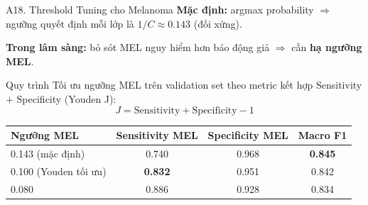 \documentclass[10pt, aspectratio=169]{beamer}
\begin{document}
\begin{frame}{A18. Threshold Tuning cho Melanoma}
    \footnotesize
    \textbf{Mặc định:} argmax probability $\Rightarrow$ ngưỡng quyết định mỗi lớp là $1/C \approx 0.143$ (đối xứng).

    \textbf{Trong lâm sàng:} bỏ sót MEL nguy hiểm hơn báo động giả $\Rightarrow$ cần \textbf{hạ ngưỡng MEL}.

    \vspace{0.2cm}
    \begin{block}{Quy trình}
        \footnotesize Tối ưu ngưỡng MEL trên validation set theo metric kết hợp Sensitivity $+$ Specificity (Youden J):
        \[
            J = \mathrm{Sensitivity} + \mathrm{Specificity} - 1
        \]
    \end{block}

    \begin{table}[]
        \scriptsize \centering
        \begin{tabular}{lccc}
        \toprule
        \rowcolor{usthblue!25} \textbf{Ngưỡng MEL} & \textbf{Sensitivity MEL} & \textbf{Specificity MEL} & \textbf{Macro F1} \\
        \midrule
        0.143 (mặc định) & 0.740 & 0.968 & \textbf{0.845} \\
        0.100 (Youden tối ưu) & \textbf{0.832} & 0.951 & 0.842 \\
        0.080            & 0.886 & 0.928 & 0.834 \\
        \bottomrule
        \end{tabular}
    \end{table}

\end{frame}
\end{document}
